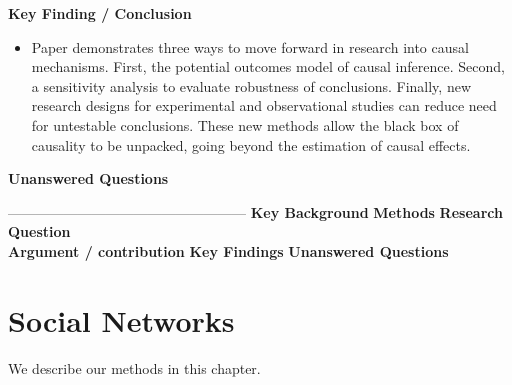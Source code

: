 \documentclass[
]{book}
\providecommand{\tightlist}{%
  \setlength{\itemsep}{0pt}\setlength{\parskip}{0pt}}
\begin{document}
\textbf{Key Finding / Conclusion}

\begin{itemize}
\tightlist
\item
  Paper demonstrates three ways to move forward in research into causal mechanisms. First, the potential outcomes model of causal inference. Second, a sensitivity analysis to evaluate robustness of conclusions. Finally, new research designs for experimental and observational studies can reduce need for untestable conclusions. These new methods allow the black box of causality to be unpacked, going beyond the estimation of causal effects.
\end{itemize}

\textbf{Unanswered Questions}

---------------------------------------------------
\textbf{Key Background}
\textbf{Methods}
\textbf{Research Question}\\
\textbf{Argument / contribution}
\textbf{Key Findings}
\textbf{Unanswered Questions}

\hypertarget{social-networks}{%
\chapter{Social Networks}\label{social-networks}}

We describe our methods in this chapter.

  
\end{document}
